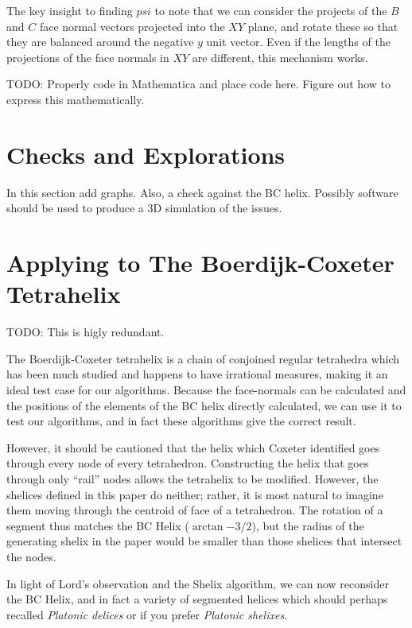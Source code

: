 \documentclass[11pt]{article}
\begin{document}
{The key insight to finding $psi$ to note that we
can consider the projects of the $B$ and $C$ face normal vectors
projected into the $XY$ plane, and rotate these so that they
are balanced around the negative $y$ unit vector. Even
if the lengths of the projections of the face normals in $XY$
are different, this mechanism works.

TODO: Properly code in Mathematica and place code here.
Figure out how to express this mathematically.

\section{Checks and Explorations}

In this section add graphs. Also, a check against the BC helix.
Possibly software should be used to produce a 3D simulation
of the issues.


\section{Applying to The Boerdijk-Coxeter Tetrahelix}

TODO: This is higly redundant.

The Boerdijk-Coxeter tetrahelix is a chain of conjoined regular tetrahedra
which has been much studied\cite{coxeter1985simplicial,sadler2013periodic,fuller1982synergetics,read2018transforming} and happens to have irrational measures, making it an ideal
test case for our algorithms. Because the face-normals can be calculated and the
positions of the elements of the BC helix directly calculated, we can use
it to test our algorithms, and in fact these algorithms give the correct result.

However, it should be cautioned that the helix which Coxeter identified\cite{coxeter1985simplicial} goes through every node of every tetrahedron. Constructing the helix that goes
through only ``rail'' nodes allows the tetrahelix to be modified\cite{read2018transforming}.
However, the shelices defined in this paper do neither; rather, it is most natural to
imagine them moving through the centroid of face of a tetrahedron. The rotation of a
segment thus matches the BC Helix ($\arctan{-3/2}$), but the radius of the
generating shelix in the paper would be smaller than those shelices that intersect the nodes.

In light of Lord's observation and the Shelix algorithm, we can now
reconsider the BC Helix, and in fact a variety of segmented helices which
should perhaps recalled {\em Platonic delices} or if you prefer {\em Platonic shelixes}.

}
\end{document}
